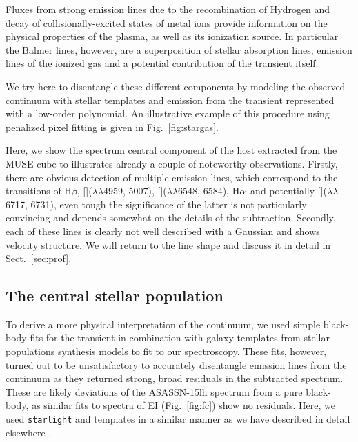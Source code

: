 \documentclass[traditabstract]{aa}
\newcommand{\hb}{H$\beta$}
\newcommand{\ha}{H$\alpha$}
\newcommand{\sii}{[\ion{S}{ii}]}
\newcommand{\oiii}{[\ion{O}{iii}]}
\newcommand{\nii}{[\ion{N}{ii}]}
\begin{document}
Fluxes from strong emission lines due to the recombination of Hydrogen and decay of collisionally-excited states of metal ions provide information on the physical properties of the plasma, as well as its ionization source. In particular the Balmer lines, however, are a superposition of stellar absorption lines, emission lines of the ionized gas and a potential contribution of the transient itself. 

We try here to disentangle these different components by modeling the observed continuum with stellar templates and emission from the transient represented with a low-order polynomial. An illustrative example of this procedure using penalized pixel fitting \citep[pPXF,][]{2004PASP..116..138C, 2017MNRAS.466..798C} is given in Fig.~\ref{fig:stargas}.

Here, we show the spectrum central component of the host extracted from the MUSE cube to illustrates already a couple of noteworthy observations. Firstly, there are obvious detection of multiple emission lines, which correspond to the transitions of \hb, \oiii($\lambda\lambda$4959, 5007), \nii($\lambda\lambda$6548, 6584), \ha\, and potentially \sii($\lambda\lambda$6717, 6731), even tough the significance of the latter is not particularly convincing and depends somewhat on the details of the subtraction. Secondly, each of these lines is clearly not well described with a Gaussian and shows velocity structure. We will return to the line shape and discuss it in detail in Sect.~\ref{sec:prof}.

\subsection{The central stellar population}
\label{sec:spop}

To derive a more physical interpretation of the continuum, we used simple black-body fits for the transient in combination with galaxy templates from stellar populations synthesis models to fit to our spectroscopy. These fits, however, turned out to be unsatisfactory to accurately disentangle emission lines from the continuum as they returned strong, broad residuals in the subtracted spectrum. These are likely deviations of the ASASSN-15lh spectrum from a pure black-body, as similar fits to spectra of EI (Fig.~\ref{fig:fc}) show no residuals. Here, we used \texttt{starlight} \citep{2005MNRAS.358..363C, 2009RMxAC..35..127C} and \citet{2003MNRAS.344.1000B} templates in a similar manner as we have described in detail elsewhere \citep{2016MNRAS.455.4087G, 2017arXiv170205430K}.
\end{document}
